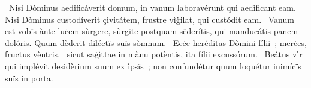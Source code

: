 \psalmChapterWithInscription{}
{ }
{%
~Nisi Dòminus aedificáverit domum, in vanum laboravérunt qui aedìficant eam. Nisi Dòminus custodíverit çivitátem, frustre vìġilat, qui custódit eam. 
~Vanum est vobïs ànte luċem sùrgere, sùrgite postquam sëderítis, qui manducátis panem dolóris. Quum dèderit diléctïs suïs sòmnum. 
~Ecċe heréditas Dòmini fílii~; merċes, fructus vèntris. 
~sicut saġìttae in mànu potèntis, ita fílii excussórum. 
~Beátus vìr qui implévit desidèrium suum ex ìpsïs~; non confundétur quum loquétur inimícïs suïs in porta. 
}
